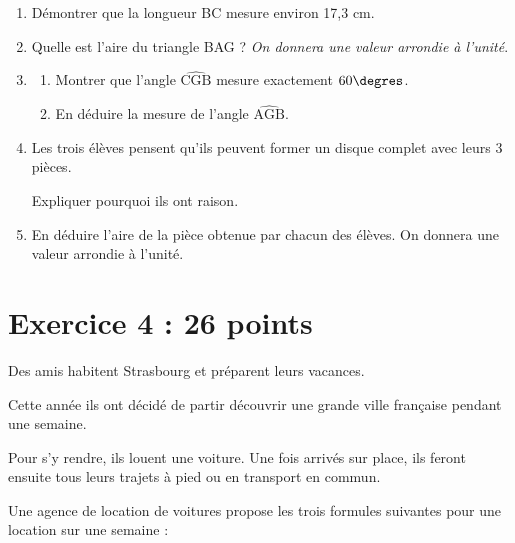 \documentclass[11pt]{article}
\begin{document}
\begin{enumerate}
\item Démontrer que la longueur BC mesure environ 17,3 cm.
\item Quelle est l'aire du triangle BAG ? \emph{On donnera une valeur arrondie à l'unité}.
\item 
	\begin{enumerate}
		\item Montrer que l'angle $\widehat{\text{CGB}}$ mesure exactement $60\degres$.
		\item En déduire la mesure de l'angle $\widehat{\text{AGB}}$.
	\end{enumerate}
\item Les trois élèves pensent qu'ils peuvent former un disque complet avec leurs 3 pièces.

Expliquer pourquoi ils ont raison.
\item En déduire l'aire de la pièce obtenue par chacun des élèves. On donnera une valeur arrondie à l'unité.
\end{enumerate}

\section*{Exercice 4 : \hfill 26 points}

Des amis habitent Strasbourg et préparent leurs vacances.

Cette année ils ont décidé de partir découvrir une grande ville française pendant une semaine. 

Pour s'y rendre, ils louent une voiture. Une fois arrivés sur place, ils feront ensuite tous leurs trajets à pied ou en transport en commun.

Une agence de location de voitures propose les trois formules suivantes pour une location sur une semaine :
\end{document}
